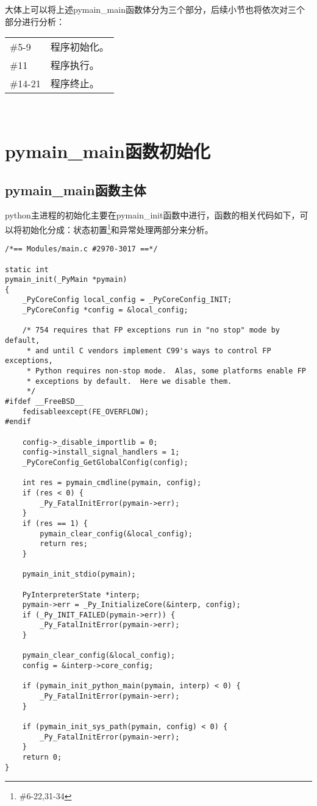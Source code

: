 \documentclass[UTF8]{book}
\begin{document}
大体上可以将上述pymain\_main函数体分为三个部分，后续小节也将依次对三个部分进行分析：\par
\begin{tabular*}{8cm}{ll}  
    \#5-9 & 程序初始化。\\
    \#11  & 程序执行。\\
    \#14-21 &程序终止。\\
    \end{tabular*}  \

\newpage
\section{pymain\_main函数初始化}
\subsection{pymain\_main函数主体}
python主进程的初始化主要在pymain\_init函数中进行，函数的相关代码如下，可以将初始化分成：状态初置\footnote[1]{\#6-22,31-34}和异常处理两部分来分析。
\begin{lstlisting}
/*== Modules/main.c #2970-3017 ==*/

static int
pymain_init(_PyMain *pymain)
{
    _PyCoreConfig local_config = _PyCoreConfig_INIT;
    _PyCoreConfig *config = &local_config;

    /* 754 requires that FP exceptions run in "no stop" mode by default,
     * and until C vendors implement C99's ways to control FP exceptions,
     * Python requires non-stop mode.  Alas, some platforms enable FP
     * exceptions by default.  Here we disable them.
     */
#ifdef __FreeBSD__
    fedisableexcept(FE_OVERFLOW);
#endif

    config->_disable_importlib = 0;
    config->install_signal_handlers = 1;
    _PyCoreConfig_GetGlobalConfig(config);

    int res = pymain_cmdline(pymain, config);
    if (res < 0) {
        _Py_FatalInitError(pymain->err);
    }
    if (res == 1) {
        pymain_clear_config(&local_config);
        return res;
    }

    pymain_init_stdio(pymain);

    PyInterpreterState *interp;
    pymain->err = _Py_InitializeCore(&interp, config);
    if (_Py_INIT_FAILED(pymain->err)) {
        _Py_FatalInitError(pymain->err);
    }

    pymain_clear_config(&local_config);
    config = &interp->core_config;

    if (pymain_init_python_main(pymain, interp) < 0) {
        _Py_FatalInitError(pymain->err);
    }

    if (pymain_init_sys_path(pymain, config) < 0) {
        _Py_FatalInitError(pymain->err);
    }
    return 0;
}
\end{lstlisting}
\end{document}
